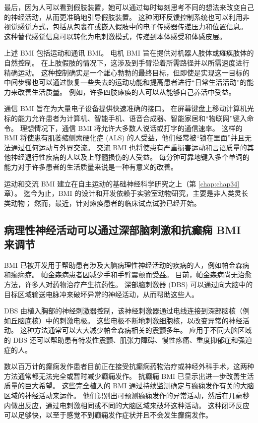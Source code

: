 最后，因为人可以看到假肢装置，她可以通过每时每刻思考不同的想法来改变自己的神经活动，从而更准确地引导假肢装置。 
这种闭环反馈控制系统也可以利用非视觉感觉方式，包括从包裹在或嵌入假肢中的电子传感器传递压力和位置信息。 
这种替代感觉信息可以转化为电刺激模式，传递到本体感受和体感皮层。


上述 BMI 包括运动和通讯 BMI。 
电机 BMI 旨在提供对机器人肢体或瘫痪肢体的自然控制。 
在上肢假肢的情况下，这涉及到手臂沿着所需路径并以所需速度进行精确运动。 
这种控制确实是一个雄心勃勃的最终目标，但即使是实现这一目标的中间步骤也可以通过恢复一些失去的运动功能和提高患者进行“日常生活活动”的能力来改善生活质量。
例如，许多四肢瘫痪的人可以从能够自己养活中受益。


通信 BMI 旨在为大量电子设备提供快速准确的接口。 
在屏幕键盘上移动计算机光标的能力允许患者为计算机、智能手机、语音合成器、智能家居和“物联网”键入命令。 
理想情况下，通信 BMI 将允许大多数人说话或打字的通信速率。 
这样的 BMI 将使患有肌萎缩侧索硬化症 (ALS) 的人受益，他们经常被“锁在里面”并且无法通过任何运动与外界交流。 
交流 BMI 也将使患有严重损害运动和言语质量的其他神经退行性疾病的人以及上脊髓损伤的人受益。 
每分钟可靠地键入多个单词的能力对于许多患者的生活质量来说是一种有意义的改善。


运动和交流 BMI 建立在自主运动的基础神经科学研究之上（第 \ref{chap:chap34} 章）。 
迄今为止，BMI 的设计和开发依赖于实验室动物研究，主要是非人类灵长类动物； 然而，最近，针对瘫痪患者的临床试点试验已经开始。


\subsection{病理性神经活动可以通过深部脑刺激和抗癫痫 BMI 来调节}
BMI 已被开发用于帮助患有涉及大脑病理性神经活动的疾病的人，例如帕金森病和癫痫症。 
帕金森病患者因减少手和手臂震颤而受益。 
目前，帕金森病尚无治愈方法，许多人对药物治疗产生抗药性。 
深部脑刺激器 (DBS) 可以通过向大脑中的目标区域输送电脉冲来破坏异常的神经活动，从而帮助这些人。


DBS 由植入胸部的神经刺激器控制，该神经刺激器通过电线连接到深部脑核（例如丘脑底核）中的刺激电极。 
这些电极不断地刺激细胞核，以改变异常的神经活动。 
这种方法通常可以大大减少帕金森病相关的震颤多年。 
应用于不同大脑区域的 DBS 还可以帮助患有特发性震颤、肌张力障碍、慢性疼痛、重度抑郁症和强迫症的人。


数以百万计的癫痫发作患者目前正在接受抗癫痫药物治疗或神经外科手术，这两种方法通常都无法完全或暂时减少癫痫发作。 
抗癫痫 BMI 已显示出进一步改善生活质量的巨大希望。 
这些完全植入的 BMI 通过持续监测确定与癫痫发作有关的大脑区域的神经活动来运作。 
他们识别出可预测癫痫发作的异常活动，然后在几毫秒内做出反应，通过电刺激相同或不同的大脑区域来破坏这种活动。 
这种闭环反应可以足够快，以至于感觉不到癫痫发作症状并且不会发生癫痫发作。


